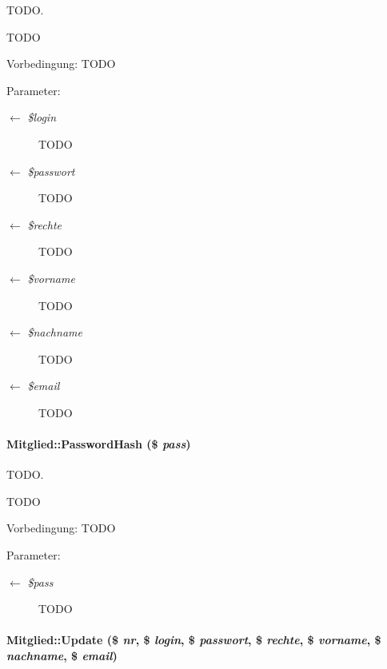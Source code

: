 TODO. 

TODO \begin{Desc}
\item[Vorbedingung:]TODO \end{Desc}
\begin{Desc}
\item[Parameter:]
\begin{description}
\item[\mbox{$\leftarrow$} {\em \$login}]TODO \item[\mbox{$\leftarrow$} {\em \$passwort}]TODO \item[\mbox{$\leftarrow$} {\em \$rechte}]TODO \item[\mbox{$\leftarrow$} {\em \$vorname}]TODO \item[\mbox{$\leftarrow$} {\em \$nachname}]TODO \item[\mbox{$\leftarrow$} {\em \$email}]TODO \end{description}
\end{Desc}
\hypertarget{classMitglied_9b13db80866c22bf992e73f2eb75e369}{
\paragraph[PasswordHash]{\setlength{\rightskip}{0pt plus 5cm}Mitglied::Password\-Hash (\$ {\em pass})}\hfill}
\label{classMitglied_9b13db80866c22bf992e73f2eb75e369}


TODO. 

TODO \begin{Desc}
\item[Vorbedingung:]TODO \end{Desc}
\begin{Desc}
\item[Parameter:]
\begin{description}
\item[\mbox{$\leftarrow$} {\em \$pass}]TODO \end{description}
\end{Desc}
\hypertarget{classMitglied_0d173487bebdd0579a70ea007b37b5ec}{
\paragraph[Update]{\setlength{\rightskip}{0pt plus 5cm}Mitglied::Update (\$ {\em nr}, \$ {\em login}, \$ {\em passwort}, \$ {\em rechte}, \$ {\em vorname}, \$ {\em nachname}, \$ {\em email})}\hfill}
\label{classMitglied_0d173487bebdd0579a70ea007b37b5ec}


